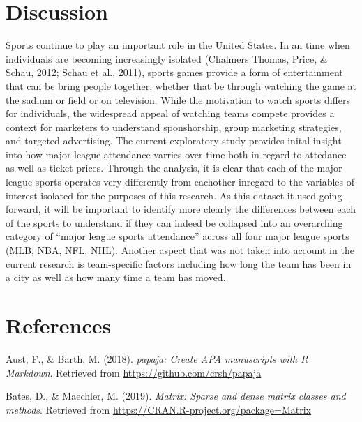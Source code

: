 \documentclass[man, fleqn, noextraspace,floatsintext]{apa6}
\begin{document}
\hypertarget{discussion-1}{%
\section{Discussion}\label{discussion-1}}

Sports continue to play an important role in the United States. In an time when individuals are becoming increasingly isolated (Chalmers Thomas, Price, \& Schau, 2012; Schau et al., 2011), sports games provide a form of entertainment that can be bring people together, whether that be through watching the game at the sadium or field or on television. While the motivation to watch sports differs for individuals, the widespread appeal of watching teams compete provides a context for marketers to understand sponshorship, group marketing strategies, and targeted advertising.
The current exploratory study provides inital insight into how major league attendance varries over time both in regard to attedance as well as ticket prices. Through the analysis, it is clear that each of the major league sports operates very differently from eachother inregard to the variables of interest isolated for the purposes of this research.
As this dataset it used going forward, it will be important to identify more clearly the differences between each of the sports to understand if they can indeed be collapsed into an overarching category of \enquote{major league sports attendance} across all four major league sports (MLB, NBA, NFL, NHL). Another aspect that was not taken into account in the current research is team-specific factors including how long the team has been in a city as well as how many time a team has moved.

\newpage

\hypertarget{references}{%
\section{References}\label{references}}

\begingroup
\setlength{\parindent}{-0.5in}
\setlength{\leftskip}{0.5in}

\hypertarget{refs}{}
\leavevmode\hypertarget{ref-R-papaja}{}%
Aust, F., \& Barth, M. (2018). \emph{papaja: Create APA manuscripts with R Markdown}. Retrieved from \url{https://github.com/crsh/papaja}

\leavevmode\hypertarget{ref-R-Matrix}{}%
Bates, D., \& Maechler, M. (2019). \emph{Matrix: Sparse and dense matrix classes and methods}. Retrieved from \url{https://CRAN.R-project.org/package=Matrix}
\end{document}
